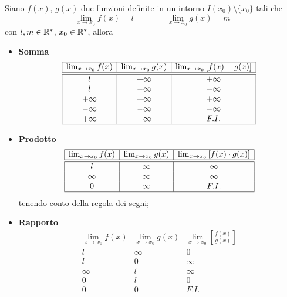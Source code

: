 \documentclass{book}     %
\begin{document}
\begin{shadedTheorem}
    Siano $f(x)$, $g(x)$ due funzioni definite in un intorno $I(x_0)\setminus \{x_0\}$ tali che
        \[\lim_{x\to x_0}f(x)=l\qquad \qquad \lim_{x\to x_0}g(x)=m\]
        con $l,m\in \mathbb{R}^\ast$, $x_0\in \mathbb{R}^\ast$, allora\\
        \begin{itemize}
            \item \textbf{Somma}
            \[\begin{array}{|c|c|c|}
                \hline
                \lim_{x\to x_0}f(x)& \lim_{x\to x_0}g(x)& \lim_{x\to x_0}\left[ f(x)+g(x) \right] \\ \hline\hline
                l & +\infty & +\infty\\
                l & -\infty & -\infty\\
                +\infty & +\infty & +\infty\\
                -\infty & -\infty & -\infty\\
                +\infty & -\infty & F. I. \\\hline
            \end{array}\]
            \item \textbf{Prodotto}
            \[\begin{array}{|c|c|c|}
                \hline
                \lim_{x\to x_0}f(x)& \lim_{x\to x_0}g(x)& \lim_{x\to x_0}\left[ f(x)\cdot g(x) \right] \\ \hline\hline
                l & \infty & \infty\\
                \infty & \infty & \infty\\
                0 & \infty & F. I. \\\hline
            \end{array}\]
            tenendo conto della regola dei segni;
            \item \textbf{Rapporto}
            \[\begin{array}{|c|c|c|}
                \hline
                \lim_{x\to x_0}f(x)& \lim_{x\to x_0}g(x)& \lim_{x\to x_0}\left[ \frac{f(x)}{g(x)} \right] \\ \hline\hline
                l & \infty & 0\\
                l &  0 &\infty \\
                \infty & l & \infty\\
                0 & l & 0\\
                0 & 0 & F. I. \\

\end{array}\]
\end{itemize}
\end{shadedTheorem}
\end{document}
